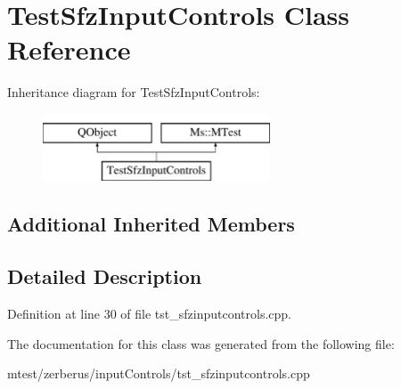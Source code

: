 \hypertarget{class_test_sfz_input_controls}{}\section{Test\+Sfz\+Input\+Controls Class Reference}
\label{class_test_sfz_input_controls}
Inheritance diagram for Test\+Sfz\+Input\+Controls\+:\begin{figure}[H]
\begin{center}
\leavevmode
\includegraphics[height=2.000000cm]{class_test_sfz_input_controls}
\end{center}
\end{figure}
\subsection*{Additional Inherited Members}


\subsection{Detailed Description}


Definition at line 30 of file tst\+\_\+sfzinputcontrols.\+cpp.



The documentation for this class was generated from the following file\+:\begin{DoxyCompactItemize}
\item 
mtest/zerberus/input\+Controls/tst\+\_\+sfzinputcontrols.\+cpp\end{DoxyCompactItemize}
